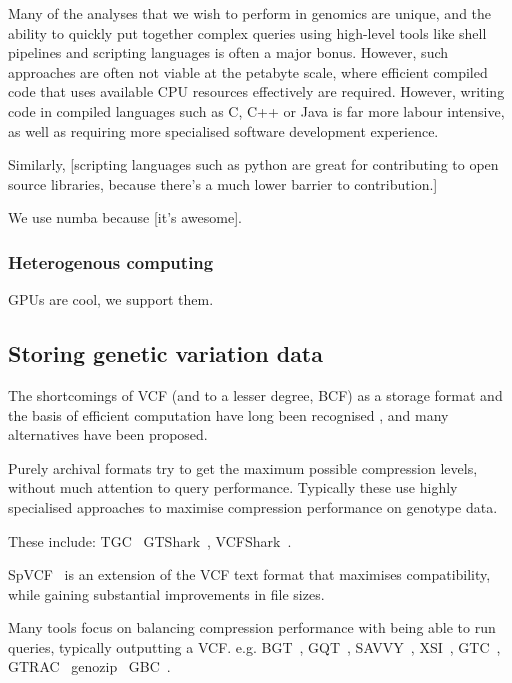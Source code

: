 \documentclass[a4paper,num-refs]{oup-contemporary}
\begin{document}
Many of the analyses that we wish to perform in genomics are unique,
and the ability to quickly put together complex queries using
high-level tools like shell pipelines and scripting languages
is often a major bonus. However, such approaches are often not
viable at the petabyte scale, where efficient compiled code that
uses available CPU resources effectively are required. However,
writing code in compiled languages such as C, C++ or Java
is far more labour intensive, as well as requiring more specialised
software development experience.

Similarly, [scripting languages such as python are great for
contributing to open source libraries, because there's a much
lower barrier to contribution.]

We use numba because [it's awesome].

\subsubsection{Heterogenous computing}

GPUs are cool, we support them.


\subsection{Storing genetic variation data}
The shortcomings of VCF (and to a lesser degree, BCF) as a storage
format and the basis of efficient computation have long been
recognised \citep[e.g.][]{kelleher2013processing,layer2016efficient,li2016bgt},
and many alternatives
have been proposed.

Purely archival formats try to get the maximum possible compression levels,
without much attention to query performance. Typically these use
highly specialised approaches to maximise compression performance
on genotype data.

These include:
TGC~\citep{deorowicz2013genome}
GTShark~\citep{deorowicz2019gtshark},
VCFShark~\citep{deorowicz2021vcfshark}.

SpVCF~\citep{lin2020sparse} is an extension of the VCF text
format that maximises compatibility, while gaining substantial
improvements in file sizes.

Many tools focus on balancing compression performance with
being able to run queries, typically outputting a VCF.
e.g.
BGT~\citep{li2016bgt},
GQT~\citep{layer2016efficient},
SAVVY~\citep{lefaive2021sparse},
XSI~\citep{wertenbroek2022xsi},
GTC~\citep{danek2018gtc},
GTRAC~\citep{tatwawadi2016gtrac}
genozip~\citep{lan2020genozip,lan2021genozip}
GBC~\citep{zhang2023gbc}.
\end{document}
